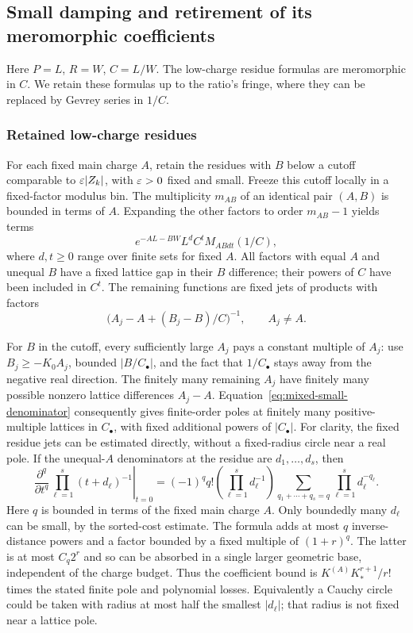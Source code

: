 \subsection{Small damping and retirement of its meromorphic coefficients}

Here $P=L$, $R=W$, $C=L/W$. The low-charge residue formulas are
meromorphic in $C$. We retain these formulas up to the ratio's fringe,
where they can be replaced by Gevrey series in $1/C$.

\subsubsection{Retained low-charge residues}

For each fixed main charge $A$, retain
the residues with $B$ below a cutoff comparable to
$\varepsilon|Z_k|$, with $\varepsilon>0$ fixed and small. Freeze this cutoff
locally in a fixed-factor modulus bin. The multiplicity $m_{AB}$
of an identical pair $(A,B)$ is bounded in terms of $A$.
Expanding the other factors to order $m_{AB}-1$ yields terms
\begin{equation}\label{eq:mixed-small-residue}
 e^{-AL-BW}L^d C^t M_{ABdt}(1/C),
\end{equation}
where $d,t\geq0$ range over finite sets for fixed $A$. All factors
with equal $A$ and unequal $B$ have a fixed lattice gap in their
$B$ difference; their powers of $C$ have been included in $C^t$.
The remaining functions are fixed jets of products with factors
\begin{equation}\label{eq:mixed-small-denominator}
 \bigl(A_j-A+(B_j-B)/C\bigr)^{-1},\qquad A_j\ne A.
\end{equation}

For $B$ in the cutoff, every sufficiently large $A_j$ pays a
constant multiple of $A_j$: use $B_j\geq-K_0A_j$, bounded
$|B/C_\bullet|$, and the fact that $1/C_\bullet$ stays away from
the negative real direction. The finitely many remaining $A_j$
have finitely many possible nonzero lattice differences $A_j-A$.
Equation~\eqref{eq:mixed-small-denominator} consequently gives
finite-order poles at finitely many positive-multiple lattices in
$C_\bullet$, with fixed additional powers of $|C_\bullet|$.
For clarity, the fixed residue jets can be estimated directly,
without a fixed-radius circle near a real pole. If the unequal-$A$
denominators at the residue are $d_1,\ldots,d_s$, then
\[
 \left.\frac{\partial^q}{\partial t^q}
       \prod_{\ell=1}^s(t+d_\ell)^{-1}\right|_{t=0}
 =(-1)^q q!\left(\prod_{\ell=1}^s d_\ell^{-1}\right)
   \sum_{q_1+\cdots+q_s=q}\prod_{\ell=1}^s d_\ell^{-q_\ell}.
\]
Here $q$ is bounded in terms of the fixed main charge $A$.
Only boundedly many $d_\ell$ can be small, by the sorted-cost
estimate. The formula adds at most $q$ inverse-distance powers
and a factor bounded by a fixed multiple of $(1+r)^q$.
The latter is at most $C_q2^r$ and so can be absorbed in a single
larger geometric base, independent of the charge budget. Thus
the coefficient bound is $K^{(A)}K_*^{r+1}/r!$ times the stated
finite pole and polynomial losses. Equivalently a Cauchy circle
could be taken with radius at most half the smallest $|d_\ell|$;
that radius is not fixed near a lattice pole.

